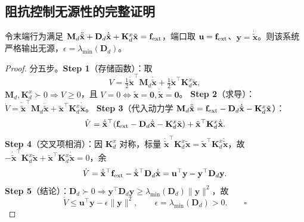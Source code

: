 \subsection{阻抗控制无源性的完整证明}
\label{sec:os-impedance-passivity}

\begin{theorem}[标准阻抗控制器严格输出无源]
\label{thm:os-impedance-passive}
令末端行为满足 $\mathbf M_d\ddot{\tilde{\mathbf x}}+\mathbf D_d\dot{\tilde{\mathbf x}}+\mathbf K_d^x\tilde{\mathbf x}=\mathbf f_{\rm ext}$，端口取 $\mathbf u=\mathbf f_{\rm ext}$、$\mathbf y=\dot{\tilde{\mathbf x}}$。则该系统严格输出无源，$\epsilon=\lambda_{\min}(\mathbf D_d)$。
\end{theorem}
\begin{proof}
分五步。\textbf{Step 1}（存储函数）：取
\begin{equation}
  V=\tfrac12\dot{\tilde{\mathbf x}}^\top\mathbf M_d\dot{\tilde{\mathbf x}}+\tfrac12\tilde{\mathbf x}^\top\mathbf K_d^x\tilde{\mathbf x},
  \label{eq:os-storage}
\end{equation}
$\mathbf M_d,\mathbf K_d^x\succ0\Rightarrow V\ge0$，且 $V=0\iff\tilde{\mathbf x}=\mathbf 0,\dot{\tilde{\mathbf x}}=\mathbf 0$。
\textbf{Step 2}（求导）：$\dot V=\dot{\tilde{\mathbf x}}^\top\mathbf M_d\ddot{\tilde{\mathbf x}}+\tilde{\mathbf x}^\top\mathbf K_d^x\dot{\tilde{\mathbf x}}$。
\textbf{Step 3}（代入动力学 $\mathbf M_d\ddot{\tilde{\mathbf x}}=\mathbf f_{\rm ext}-\mathbf D_d\dot{\tilde{\mathbf x}}-\mathbf K_d^x\tilde{\mathbf x}$）：
\[
  \dot V=\dot{\tilde{\mathbf x}}^\top(\mathbf f_{\rm ext}-\mathbf D_d\dot{\tilde{\mathbf x}}-\mathbf K_d^x\tilde{\mathbf x})+\tilde{\mathbf x}^\top\mathbf K_d^x\dot{\tilde{\mathbf x}}.
\]
\textbf{Step 4}（交叉项相消）：因 $\mathbf K_d^x$ 对称，标量 $\dot{\tilde{\mathbf x}}^\top\mathbf K_d^x\tilde{\mathbf x}=\tilde{\mathbf x}^\top\mathbf K_d^x\dot{\tilde{\mathbf x}}$，故 $-\dot{\tilde{\mathbf x}}^\top\mathbf K_d^x\tilde{\mathbf x}+\tilde{\mathbf x}^\top\mathbf K_d^x\dot{\tilde{\mathbf x}}=0$，余
\[
  \dot V=\dot{\tilde{\mathbf x}}^\top\mathbf f_{\rm ext}-\dot{\tilde{\mathbf x}}^\top\mathbf D_d\dot{\tilde{\mathbf x}}=\mathbf u^\top\mathbf y-\mathbf y^\top\mathbf D_d\mathbf y.
\]
\textbf{Step 5}（结论）：$\mathbf D_d\succ0\Rightarrow\mathbf y^\top\mathbf D_d\mathbf y\ge\lambda_{\min}(\mathbf D_d)\|\mathbf y\|^2$，故
\begin{equation}
  \dot V\le\mathbf u^\top\mathbf y-\epsilon\|\mathbf y\|^2,\qquad\epsilon=\lambda_{\min}(\mathbf D_d)>0.\qquad\square
  \label{eq:os-impedance-sop}
\end{equation}
\end{proof}


